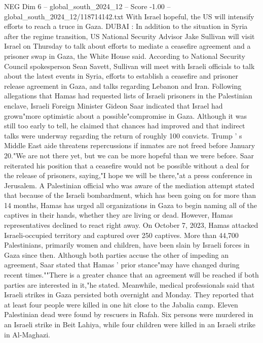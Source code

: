 \begin{textsample}{NEG Dim 6 – global\_south\_2024\_12 – Score -1.00 – global\_south\_2024\_12/118714142.txt}  \label{ex:f6_neg_025}
With Israel hopeful, the US will intensify efforts to reach a truce in Gaza.
DUBAI : In addition to the situation in Syria after the regime transition, US National Security Advisor Jake Sullivan will visit Israel on Thursday to talk about efforts to mediate a ceasefire agreement and a prisoner swap in Gaza, the White House said.
According to National Security Council spokesperson Sean Savett, Sullivan will meet with Israeli officials to talk about the latest events in Syria, efforts to establish a ceasefire and prisoner release agreement in Gaza, and talks regarding Lebanon and Iran.
Following allegations that Hamas had requested lists of Israeli prisoners in the Palestinian enclave, Israeli Foreign Minister Gideon Saar indicated that Israel had grown"more optimistic about a possible"compromise in Gaza.
Although it was still too early to tell, he claimed that chances had improved and that indirect talks were underway regarding the return of roughly 100 convicts.
Trump ' s Middle East aide threatens repercussions if inmates are not freed before January 20."We are not there yet, but we can be more hopeful than we were before.
Saar reiterated his position that a ceasefire would not be possible without a deal for the release of prisoners, saying,"I hope we will be there,"at a press conference in Jerusalem.
A Palestinian official who was aware of the mediation attempt stated that because of the Israeli bombardment, which has been going on for more than 14 months, Hamas has urged all organizations in Gaza to begin naming all of the captives in their hands, whether they are living or dead.
However, Hamas representatives declined to react right away.
On October 7, 2023, Hamas attacked Israeli-occupied territory and captured over 250 captives.
More than 44,700 Palestinians, primarily women and children, have been slain by Israeli forces in Gaza since then.
Although both parties accuse the other of impeding an agreement, Saar stated that Hamas ' prior stance"may have changed during recent times.""There is a greater chance that an agreement will be reached if both parties are interested in it,"he stated.
Meanwhile, medical professionals said that Israeli strikes in Gaza persisted both overnight and Monday.
They reported that at least four people were killed in one hit close to the Jabalia camp.
Eleven Palestinian dead were found by rescuers in Rafah.
Six persons were murdered in an Israeli strike in Beit Lahiya, while four children were killed in an Israeli strike in Al-Maghazi.

\end{textsample}
